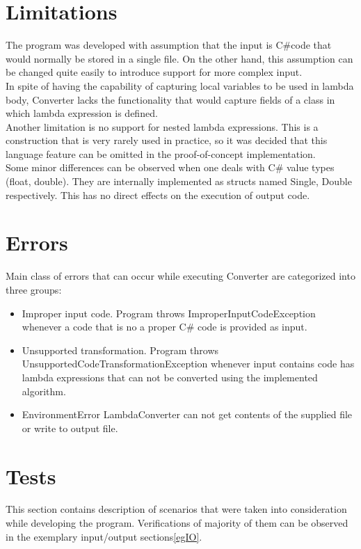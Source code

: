 \documentclass[]{report}
\begin{document}
    \section{Limitations}
        The program was developed with assumption that the input is C\#code that would normally be stored in a single file. On the other hand, this assumption can be changed  quite easily to introduce support for more complex input.
        \\
     In spite of having the capability of capturing local variables to be used in lambda body, Converter lacks the functionality that would capture fields of a class in which lambda expression is defined. 
     \\
     Another limitation is no support for nested lambda expressions. This is a construction that is very  rarely used in practice, so it was decided that this language feature can be omitted in the proof-of-concept implementation.
    \\
    Some minor differences can be observed when one deals with C\# value types (float, double). They are internally implemented as structs named Single, Double respectively. This has no direct effects on the execution of output code.
    \section{Errors}
    Main class of errors that can occur while executing Converter are categorized into three groups:
    \begin{itemize}
        \item Improper input code. Program throws ImproperInputCodeException whenever a code that is no a proper C\# code is provided as input.
        \item Unsupported transformation. Program throws UnsupportedCodeTransformationException whenever input contains code has lambda expressions that can not be converted using the implemented algorithm. 
        \item EnvironmentError LambdaConverter can not get contents of the supplied file or write to output file.
    \end{itemize}

    
    \section{Tests}
This section contains description of scenarios that were taken into consideration while developing the program. Verifications of majority of them can be observed in the exemplary input/output sections\ref{egIO}.
\end{document}

